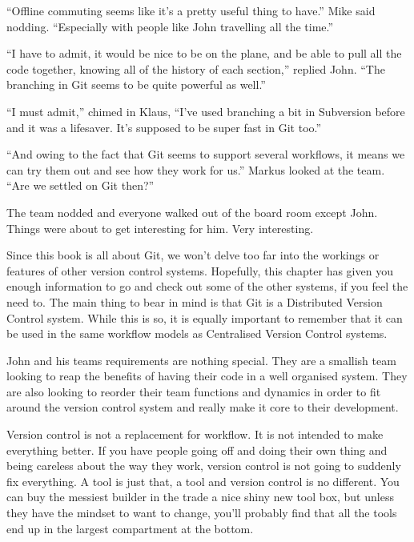 \begin{trenches}
``Offline commuting seems like it's a pretty useful thing to have.''  Mike said nodding.  ``Especially with people like John travelling all the time.''

``I have to admit, it would be nice to be on the plane, and be able to pull all the code together, knowing all of the history of each section,'' replied John.  ``The branching in Git seems to be quite powerful as well.''

``I must admit,'' chimed in Klaus, ``I've used branching a bit in Subversion before and it was a lifesaver.  It's supposed to be super fast in Git too.''

``And owing to the fact that Git seems to support several workflows, it means we can try them out and see how they work for us.''  Markus looked at the team.  ``Are we settled on Git then?''

The team nodded and everyone walked out of the board room except John.  Things were about to get interesting for him.  Very interesting.
\end{trenches}

Since this book is all about Git, we won't delve too far into the workings or features of other version control systems.  Hopefully, this chapter has given you enough information to go and check out some of the other systems, if you feel the need to.  The main thing to bear in mind is that Git is a Distributed Version Control system.  While this is so, it is equally important to remember that it can be used in the same workflow models as Centralised Version Control systems.

John and his teams requirements are nothing special.  They are a smallish team looking to reap the benefits of having their code in a well organised system.  They are also looking to reorder their team functions and dynamics in order to fit around the version control system and really make it core to their development.  

Version control is not a replacement for workflow.  It is not intended to make everything better.  If you have people going off and doing their own thing and being careless about the way they work, version control is not going to suddenly fix everything.  A tool is just that, a tool and version control is no different.  You can buy the messiest builder in the trade a nice shiny new tool box, but unless they have the mindset to want to change, you'll probably find that all the tools end up in the largest compartment at the bottom.

